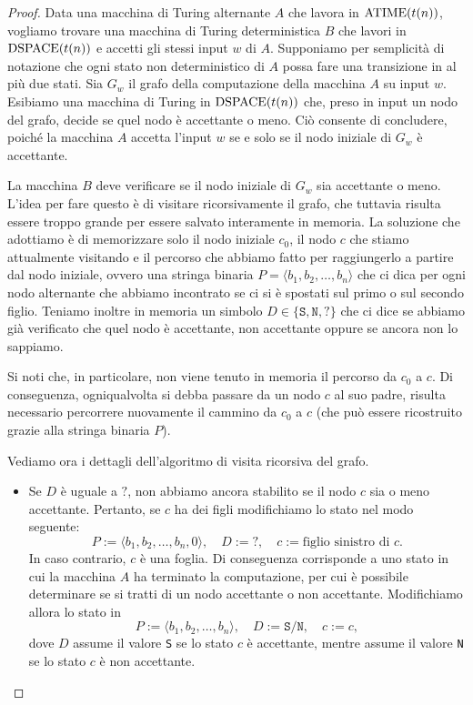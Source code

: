 \begin{proof}
 Data una macchina di Turing alternante $A$ che lavora in $\operatorname{ATIME}(t(n))$, vogliamo trovare
 una macchina di Turing deterministica $B$ che lavori in $\operatorname{DSPACE}(t(n))$ e accetti gli
 stessi input $w$ di $A$. Supponiamo per semplicità di notazione che ogni stato
 non deterministico di $A$ possa fare una transizione in al più due stati.
 Sia $G_w$ il grafo della computazione della macchina $A$ su input $w$.
 Esibiamo una macchina di Turing in $\operatorname{DSPACE}(t(n))$ che, preso in input un nodo
 del grafo, decide se quel nodo è accettante o meno. Ciò consente di concludere, poiché
 la macchina $A$ accetta l'input $w$ se e solo se il nodo iniziale
 di $G_w$ è accettante.
 
 La macchina $B$ deve verificare se il nodo iniziale di $G_w$ sia accettante o
 meno. L'idea per fare questo è di visitare ricorsivamente il grafo, che tuttavia
 risulta essere troppo grande per essere salvato interamente in memoria. La soluzione che adottiamo
 è di memorizzare solo il nodo iniziale $c_0$, il nodo $c$ che stiamo attualmente
 visitando e il percorso che abbiamo fatto per raggiungerlo a partire dal nodo
 iniziale, ovvero una stringa binaria $P = \langle b_1, b_2, \ldots, b_n \rangle$
 che ci dica per ogni nodo alternante
 che abbiamo incontrato se ci si è spostati sul primo o sul secondo figlio.
 Teniamo inoltre in memoria un simbolo $D \in \{\texttt{S}, \texttt{N}, \texttt{?}\}$ che ci dice se
 abbiamo già verificato che quel nodo è accettante, non accettante oppure
 se ancora non lo sappiamo.
 
 Si noti che, in particolare, non viene tenuto in memoria il percorso da $c_0$ a $c$.
 Di conseguenza, ogniqualvolta si debba passare da un nodo $c$ al suo padre,
 risulta necessario percorrere nuovamente il cammino da $c_0$ a $c$ (che può essere
 ricostruito grazie alla stringa binaria $P$).
 
 Vediamo ora i dettagli dell'algoritmo di visita ricorsiva del grafo.
 \begin{itemize}
  \item  Se $D$ è uguale a $\texttt{?}$, non abbiamo ancora stabilito se il nodo $c$ sia o meno
  accettante. Pertanto, se $c$ ha dei figli modifichiamo lo stato nel modo seguente:
  \[ P := \langle b_1, b_2, \ldots, b_n, 0 \rangle, \quad D := \texttt{?}, \quad c := \text{figlio sinistro di $c$}. \]
  In caso contrario, $c$ è una foglia. Di conseguenza corrisponde a uno stato in cui la macchina $A$
  ha terminato la computazione, per cui è possibile determinare se si tratti di un
  nodo accettante o non accettante. Modifichiamo allora lo stato in
  \[ P := \langle b_1, b_2, \ldots, b_n \rangle, \quad D := \texttt{S}/\texttt{N}, \quad c := c, \]
  dove $D$ assume il valore \texttt{S} se lo stato $c$ è accettante, mentre assume il valore \texttt{N} se lo stato $c$
  è non accettante.
  

\end{itemize}
\end{proof}
